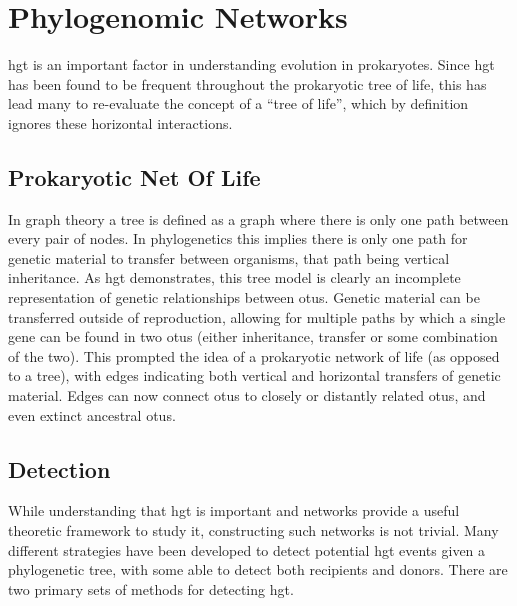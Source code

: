 \documentclass[12pt,letter]{article}
\begin{document}
\section*{Phylogenomic Networks}
\ac{hgt} is an important factor in understanding evolution in prokaryotes.
Since \ac{hgt} has been found to be frequent throughout the prokaryotic tree of life, this has lead many to re-evaluate the concept of a ``tree of life'', which by definition ignores these horizontal interactions\citep{netoflife}.
\subsection*{Prokaryotic Net Of Life}
In graph theory a tree is defined as a graph where there is only one path between every pair of nodes.
In phylogenetics this implies there is only one path for genetic material to transfer between organisms, that path being vertical inheritance.
As \ac{hgt} demonstrates, this tree model is clearly an incomplete representation of genetic relationships between \ac{otu}s.
Genetic material can be transferred outside of reproduction, allowing for multiple paths by which a single gene can be found in two \ac{otu}s (either inheritance, transfer or some combination of the two)\citep{lgt}.
This prompted the idea of a prokaryotic network of life (as opposed to a tree), with edges indicating both vertical and horizontal transfers of genetic material\citep{netoflife}.
Edges can now connect \ac{otu}s to closely or distantly related \ac{otu}s, and even extinct ancestral \ac{otu}s.
\subsection*{Detection}%
While understanding that \ac{hgt} is important and networks provide a useful theoretic framework to study it, constructing such networks is not trivial.
Many different strategies have been developed to detect potential \ac{hgt} events given a phylogenetic tree, with some able to detect both recipients and donors\citep{ihgt}.
There are two primary sets of methods for detecting \ac{hgt}.
\end{document}
